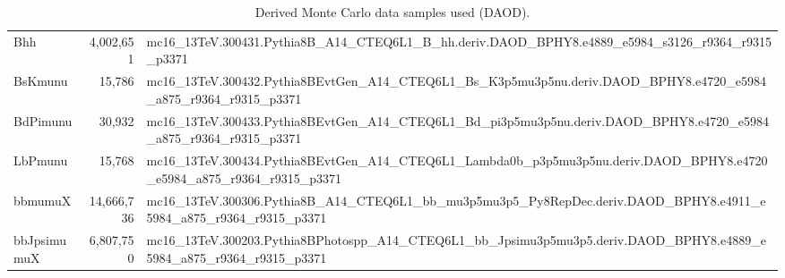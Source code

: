 \begin{table}[h]
\begin{adjustbox}{angle=90}
\begin{tabular}{|l|r|l|}
Bhh  & 4,002,651& mc16\_13TeV.300431.Pythia8B\_A14\_CTEQ6L1\_B\_hh.deriv.DAOD\_BPHY8.e4889\_e5984\_s3126\_r9364\_r9315\_p3371 \\
BsKmunu  &  15,786 & mc16\_13TeV.300432.Pythia8BEvtGen\_A14\_CTEQ6L1\_Bs\_K3p5mu3p5nu.deriv.DAOD\_BPHY8.e4720\_e5984\_a875\_r9364\_r9315\_p3371 \\
BdPimunu  &  30,932 & mc16\_13TeV.300433.Pythia8BEvtGen\_A14\_CTEQ6L1\_Bd\_pi3p5mu3p5nu.deriv.DAOD\_BPHY8.e4720\_e5984\_a875\_r9364\_r9315\_p3371  \\ 
LbPmunu  &  15,768 & mc16\_13TeV.300434.Pythia8BEvtGen\_A14\_CTEQ6L1\_Lambda0b\_p3p5mu3p5nu.deriv.DAOD\_BPHY8.e4720\_e5984\_a875\_r9364\_r9315\_p3371 \\
bbmumuX  &  14,666,736 & mc16\_13TeV.300306.Pythia8B\_A14\_CTEQ6L1\_bb\_mu3p5mu3p5\_Py8RepDec.deriv.DAOD\_BPHY8.e4911\_e5984\_a875\_r9364\_r9315\_p3371 \\
bbJpsimumuX &  6,807,750 & mc16\_13TeV.300203.Pythia8BPhotospp\_A14\_CTEQ6L1\_bb\_Jpsimu3p5mu3p5.deriv.DAOD\_BPHY8.e4889\_e5984\_a875\_r9364\_r9315\_p3371 \\
      \hline
    \end{tabular}
  \end{adjustbox}
  \caption{Derived Monte Carlo data samples used (DAOD).}
  \label{tab:MCDAODsamples}
\end{table}

\clearpage
